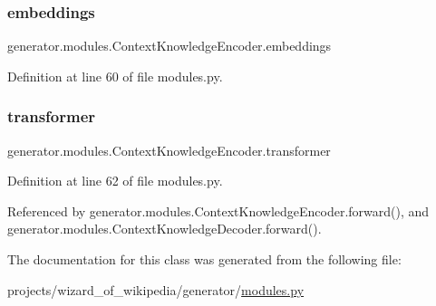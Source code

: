 \subsubsection{\texorpdfstring{embeddings}{embeddings}}
{\footnotesize\ttfamily generator.\+modules.\+Context\+Knowledge\+Encoder.\+embeddings}



Definition at line 60 of file modules.\+py.

\mbox{\label{classgenerator_1_1modules_1_1ContextKnowledgeEncoder_ac2e37a1a1e66ec7eeb00a65075dc14cf}} 
\subsubsection{\texorpdfstring{transformer}{transformer}}
{\footnotesize\ttfamily generator.\+modules.\+Context\+Knowledge\+Encoder.\+transformer}



Definition at line 62 of file modules.\+py.



Referenced by generator.\+modules.\+Context\+Knowledge\+Encoder.\+forward(), and generator.\+modules.\+Context\+Knowledge\+Decoder.\+forward().



The documentation for this class was generated from the following file\+:\begin{DoxyCompactItemize}
\item 
projects/wizard\+\_\+of\+\_\+wikipedia/generator/\hyperlink{projects_2wizard__of__wikipedia_2generator_2modules_8py}{modules.\+py}\end{DoxyCompactItemize}

